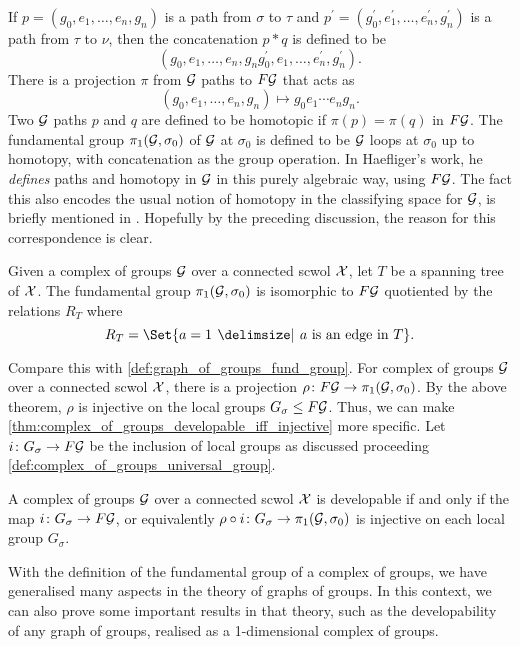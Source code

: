 If $p = (g_0, e_1, \ldots, e_n, g_n)$ is a path from $\sigma$ to  $\tau$ and  $p^\prime = (g^\prime_0, e^\prime_1, \ldots, e^\prime_n, g^\prime_n)$ is a path from $\tau$ to $\nu$, then the concatenation  $p \ast q$ is defined to be
\[
	(g_0, e_1, \ldots, e_n, g_ng^\prime_0, e_1, \ldots, e^\prime_n, g^\prime_n)
	.\]
There is a projection $\pi$ from $\mathcal{G}$ paths to $F\mathcal{G}$ that acts as
\[
	(g_0, e_1, \ldots, e_n, g_n) \mapsto g_0e_1\cdots e_ng_n
	.\]
Two $\mathcal{G}$ paths  $p$ and $q$ are defined to be homotopic if $\pi(p) = \pi(q)$ in $F\mathcal{G}$.
The fundamental group $\pi_1(\mathcal{G}, \sigma_0)$ of $\mathcal{G}$ at $\sigma_0$ is defined to be $\mathcal{G}$ loops at  $\sigma_0$ up to homotopy, with concatenation as the group operation.
In Haefliger's work, he \emph{defines} paths and homotopy in $\mathcal{G}$ in this purely algebraic way, using $F\mathcal{G}$.
The fact this also encodes the usual notion of homotopy in the classifying space for $\mathcal{G}$, is briefly mentioned in \cite[Section 3.1.a]{haefliger_complexes_1991}.
Hopefully by the preceding discussion, the reason for this correspondence is clear.
\begin{theorem}
	Given a complex of groups $\mathcal{G}$ over a connected scwol  $\mathcal{X}$, let $T$ be a spanning tree of  $\mathcal{X}$.
	The fundamental group  $\pi_1(\mathcal{G}, \sigma_0)$ is isomorphic to $F\mathcal{G}$ quotiented by the relations  $R_T$ where
	\[
		R_T = \Set{a = 1 \given a \text{ is an edge in } T}
		.\]
\end{theorem}
Compare this with \cref{def:graph_of_groups_fund_group}.
For complex of groups $\mathcal{G}$ over a connected scwol $\mathcal{X}$, there is a projection $\rho \colon F\mathcal{G} \to \pi_1(\mathcal{G},\sigma_0)$.
By the above theorem, $\rho$ is injective on the local groups $G_\sigma \leq F\mathcal{G}$.
Thus, we can make \cref{thm:complex_of_groups_developable_iff_injective} more specific.
Let $i \colon G_\sigma \to F\mathcal{G}$ be the inclusion of local groups as discussed proceeding \cref{def:complex_of_groups_universal_group}.
\begin{theorem}
	A complex of groups $\mathcal{G}$ over a connected scwol  $\mathcal{X}$ is developable if and only if the map $i \colon G_\sigma \to F\mathcal{G}$, or equivalently $\rho \circ i \colon G_\sigma \to \pi_1(\mathcal{G}, \sigma_0)$ is injective on each local group $G_\sigma$.
\end{theorem}
With the definition of the fundamental group of a complex of groups, we have generalised many aspects in the theory of graphs of groups.
In this context, we can also prove some important results in that theory, such as the developability of any graph of groups, realised as a 1-dimensional complex of groups.

